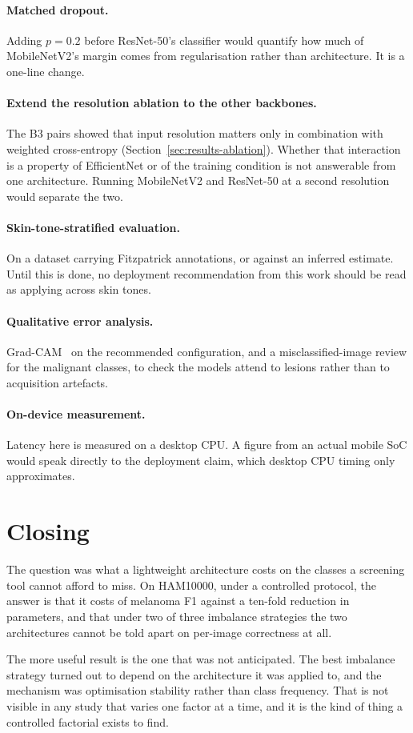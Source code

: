 \paragraph{Matched dropout.} Adding $p = 0.2$ before ResNet-50's classifier would
quantify how much of MobileNetV2's margin comes from regularisation rather than
architecture. It is a one-line change.

\paragraph{Extend the resolution ablation to the other backbones.} The B3 pairs showed
that input resolution matters only in combination with weighted cross-entropy
(Section~\ref{sec:results-ablation}). Whether that interaction is a property of
EfficientNet or of the training condition is not answerable from one architecture.
Running MobileNetV2 and ResNet-50 at a second resolution would separate the two.

\paragraph{Skin-tone-stratified evaluation.} On a dataset carrying Fitzpatrick
annotations, or against an inferred estimate. Until this is done, no deployment
recommendation from this work should be read as applying across skin tones.

\paragraph{Qualitative error analysis.} Grad-CAM~\cite{selvaraju2017gradcam} on the
recommended configuration, and a misclassified-image review for the malignant classes,
to check the models attend to lesions rather than to acquisition artefacts.

\paragraph{On-device measurement.} Latency here is measured on a desktop CPU. A figure
from an actual mobile SoC would speak directly to the deployment claim, which desktop
CPU timing only approximates.

\section{Closing}
\label{sec:conc-closing}

The question was what a lightweight architecture costs on the classes a screening tool
cannot afford to miss. On HAM10000, under a controlled protocol, the answer is that it
costs \RQoneGap{} of melanoma F1 against a ten-fold reduction in parameters, and that
under two of three imbalance strategies the two architectures cannot be told apart on
per-image correctness at all.

The more useful result is the one that was not anticipated. The best imbalance strategy
turned out to depend on the architecture it was applied to, and the mechanism was
optimisation stability rather than class frequency. That is not visible in any study that
varies one factor at a time, and it is the kind of thing a controlled factorial exists to
find.
